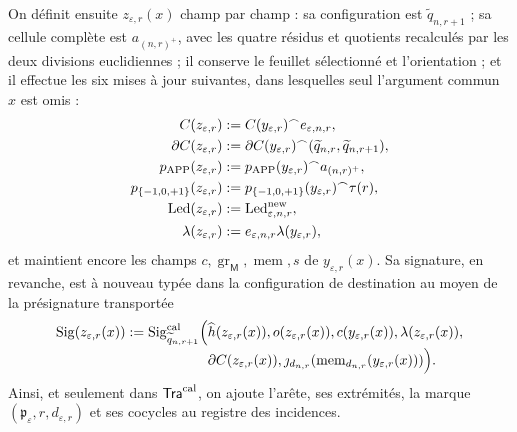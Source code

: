 On définit ensuite \(z_{\varepsilon,r}(x)\) champ par champ : sa
configuration est \(\widetilde q_{n,r+1}\) ; sa cellule complète est
\(a_{(n,r)^+}\), avec les
quatre résidus et quotients recalculés par les deux divisions euclidiennes ;
il conserve le feuillet sélectionné et l’orientation ; et il effectue les six
mises à jour suivantes, dans lesquelles seul l’argument commun \(x\) est omis :
\begin{equation}
\begin{aligned}
 C(z_{\varepsilon,r})&:=C(y_{\varepsilon,r})^\frown
       e_{\varepsilon,n,r},\\
 \partial C(z_{\varepsilon,r})&:=\partial C(y_{\varepsilon,r})^\frown
       (\widetilde q_{n,r},\widetilde q_{n,r+1}),\\
 p_{\mathrm{APP}}(z_{\varepsilon,r})&:=p_{\mathrm{APP}}(y_{\varepsilon,r})^\frown
       a_{(n,r)^+},\\
 p_{\{-1,0,+1\}}(z_{\varepsilon,r})&:=p_{\{-1,0,+1\}}(y_{\varepsilon,r})^\frown
       \tau(r),\\
 \operatorname{Led}(z_{\varepsilon,r})&:=
       \operatorname{Led}^{\rm new}_{\varepsilon,n,r},\\
 \lambda(z_{\varepsilon,r})&:=e_{\varepsilon,n,r}
       \lambda(y_{\varepsilon,r}),
\end{aligned}
 \label{hmtfg:eq:tupla-tra-cal-ch}
\end{equation}
et maintient encore les champs \(c,\operatorname{gr}_{\mathsf M},\operatorname{mem},s\) de \(y_{\varepsilon,r}(x)\). Sa signature, en revanche, est à nouveau typée dans la configuration de destination au moyen de la présignature transportée
\begin{equation}
\begin{aligned}
 \operatorname{Sig}(z_{\varepsilon,r}(x))
  :=\operatorname{Sig}^{\rm cal}_{\widetilde q_{n,r+1}}
       \Bigl(&\widehat h(z_{\varepsilon,r}(x)),
             o(z_{\varepsilon,r}(x)),c(y_{\varepsilon,r}(x)),
             \lambda(z_{\varepsilon,r}(x)),\\[-2pt]
             &\partial C(z_{\varepsilon,r}(x)),
             \jmath_{d_{n,r}}
                (\operatorname{mem}_{d_{n,r}}
                   (y_{\varepsilon,r}(x)))\Bigr).
\end{aligned}
\label{hmtfg:eq:prefirma-transporte-cal-ch}
\end{equation}
Ainsi, et seulement dans
\(\mathsf{Tra}^{\rm cal}\), on ajoute l’arête, ses extrémités, la marque
\((\mathfrak p_\varepsilon,r,d_{\varepsilon,r})\) et ses cocycles au registre des
incidences.

